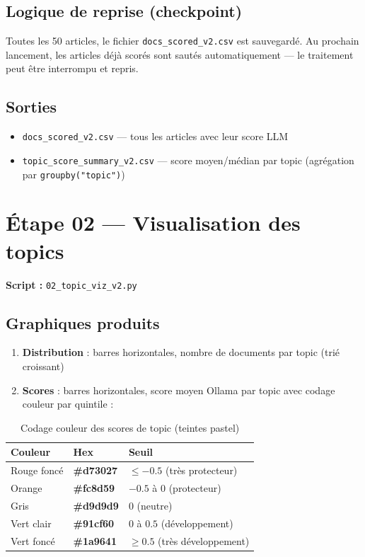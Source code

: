 \documentclass[11pt,a4paper]{report}
\newcommand{\code}[1]{\texttt{\small #1}}
\begin{document}
\subsection{Logique de reprise (checkpoint)}

Toutes les 50 articles, le fichier \code{docs\_scored\_v2.csv} est sauvegardé. Au prochain lancement, les articles déjà scorés sont sautés automatiquement — le traitement peut être interrompu et repris.

\subsection{Sorties}

\begin{itemize}
  \item \code{docs\_scored\_v2.csv} — tous les articles avec leur score LLM
  \item \code{topic\_score\_summary\_v2.csv} — score moyen/médian par topic (agrégation par \code{groupby("topic")})
\end{itemize}

\section{Étape 02 — Visualisation des topics}

\textbf{Script :} \code{02\_topic\_viz\_v2.py}

\subsection{Graphiques produits}

\begin{enumerate}
  \item \textbf{Distribution} : barres horizontales, nombre de documents par topic (trié croissant)
  \item \textbf{Scores} : barres horizontales, score moyen Ollama par topic avec codage couleur par quintile :
\end{enumerate}

\begin{table}[H]
\centering
\begin{tabular}{lll}
\toprule
\rowcolor{seuilgris!75}
\textbf{Couleur} & \textbf{Hex} & \textbf{Seuil} \\
\midrule
\cellcolor{seuilrouge!40} Rouge foncé & \textbf{\#d73027} & $\leq -0.5$ (très protecteur) \\
\cellcolor{seuilorange!40} Orange & \textbf{\#fc8d59} & $-0.5$ à $0$ (protecteur) \\
\cellcolor{seuilgris!50} Gris & \textbf{\#d9d9d9} & $0$ (neutre) \\
\cellcolor{seuilvertclair!40} Vert clair & \textbf{\#91cf60} & $0$ à $0.5$ (développement) \\
\cellcolor{seuilvertfonce!40} Vert foncé & \textbf{\#1a9641} & $\geq 0.5$ (très développement) \\
\bottomrule
\end{tabular}
\caption{Codage couleur des scores de topic (teintes pastel)}
\end{table}
\end{document}
